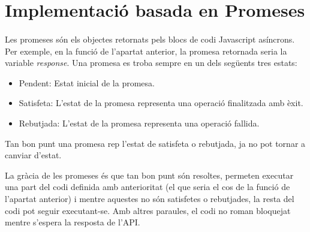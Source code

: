 \section{Implementació basada en Promeses}

    \paragraph{}
    Les promeses són els objectes retornats pels blocs de codi Javascript asíncrons. Per exemple, en la funció de l’apartat anterior, la promesa retornada seria la variable \emph{response}. Una promesa es troba sempre en un dels següents tres estats:

    \begin{itemize}
        \item Pendent: Estat inicial de la promesa.
        \item Satisfeta: L'estat de la promesa representa una operació finalitzada amb èxit.
        \item Rebutjada: L'estat de la promesa representa una operació fallida.
    \end{itemize}

    Tan bon punt una promesa rep l'estat de satisfeta o rebutjada, ja no pot tornar a canviar d'estat.

    La gràcia de les promeses és que tan bon punt són resoltes, permeten executar una part del codi definida amb anterioritat (el que seria el cos de la funció de l'apartat anterior) i mentre aquestes no són satisfetes o rebutjades, la resta del codi pot seguir executant-se. Amb altres paraules, el codi no roman bloquejat mentre s'espera la resposta de l’API.
